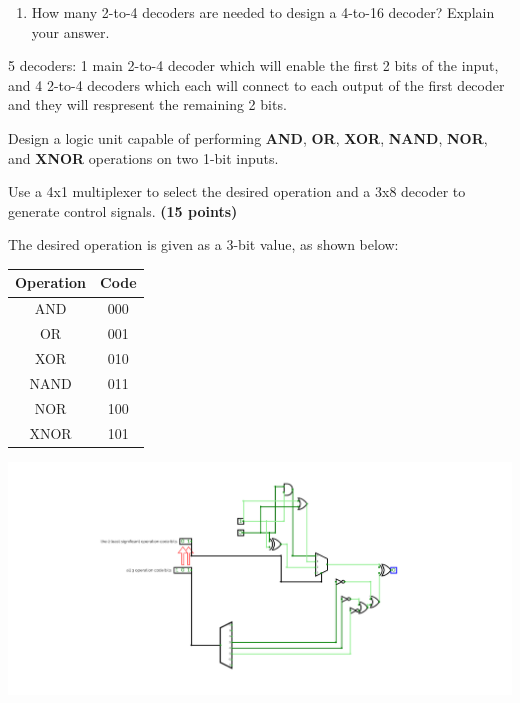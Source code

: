 \documentclass[10pt,answers]{exam}
\newcommand{\qpoints}[1]{\hfill \textbf{(#1 points)}}
\begin{document}
\begin{questions}
\begin{enumerate}[label=\alph*)]
    \item How many 2-to-4 decoders are needed to design a 4-to-16 decoder? Explain your answer.
\end{enumerate}

\begin{solution}
    5 decoders: 1 main 2-to-4 decoder which will enable the first 2 bits of the input, and 4 2-to-4 decoders which each will connect to each output of the first decoder and they will respresent the remaining 2 bits.
\end{solution}


\question Design a logic unit capable of performing \textbf{AND}, \textbf{OR}, \textbf{XOR}, \textbf{NAND}, \textbf{NOR}, and \textbf{XNOR} operations on two 1-bit inputs. 

Use a 4x1 multiplexer to select the desired operation and a 3x8 decoder to generate control signals. \qpoints{15}

The desired operation is given as a 3-bit value, as shown below:

\begin{center}
    \begin{tabular}{|c|c|}
        \hline
        \textbf{Operation} & \textbf{Code} \\ \hline
        AND & 000 \\ \hline
        OR & 001 \\ \hline
        XOR & 010 \\ \hline
        NAND & 011 \\ \hline
        NOR & 100 \\ \hline
        XNOR & 101 \\ \hline
    \end{tabular}
\end{center}

\begin{solution}
    \begin{center}
		\includegraphics[width=0.5\linewidth]{ex8.png}
		\end{center}
\end{solution}


\end{questions}
\end{document}
